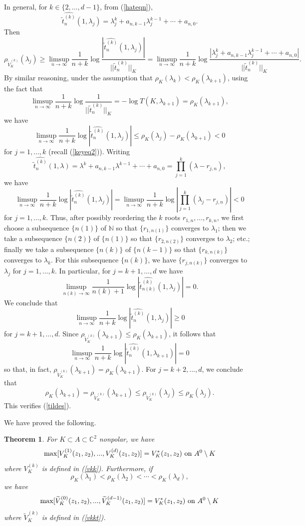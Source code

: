 \documentclass[12pt]{article}
\numberwithin{equation}{section}
\newtheorem{theorem}{Theorem}[section]
\newcommand{\C}{\mathbb{C}}
\newcommand{\N}{\mathbb{N}}
\renewcommand{\hat}{\widehat}
\renewcommand{\tilde}{\widetilde}
\begin{document}
In general, for $k\in \{2,...,d-1\}$, from (\ref{hateqn}), 
$$\hat {\tilde t_{n}^{(k)}}(1,\lambda_j) =\lambda_j^k +a_{n,k-1}\lambda_j^{k-1} +\cdots +a_{n,0}.$$
Then
$$\rho_{\tilde V_{K}^{(k)}}(\lambda_j)\geq \limsup_{n\to \infty} \frac{1}{n+k}\log \frac{ |\hat {\tilde t_{n}^{(k)}}(1,\lambda_j)|}{||\tilde t_{n}^{(k)}||_K}=\limsup_{n\to \infty} \frac{1}{n+k}\log \frac{| \lambda_j^k +a_{n,k-1}\lambda_j^{k-1} +\cdots +a_{n,0}|}{||\tilde t_{n}^{(k)}||_K}.$$
By similar reasoning, under the assumption that $\rho_K(\lambda_{k}) < \rho_K(\lambda_{k+1})$,
using the fact that
$$\limsup_{n\to \infty} \frac{1}{n+k}\log \frac{1}{||\tilde t_{n}^{(k)}||_K}= -\log T(K,\lambda_{k+1})= \rho_K(\lambda_{k+1}),$$
we have 
$$\limsup_{n\to \infty}  \frac{1}{n+k} \log |\hat {\tilde t_{n}^{(k)}}(1,\lambda_j)|\leq \rho_K(\lambda_j)-\rho_K(\lambda_{k+1}) <0$$
for $j=1,...,k$ (recall (\ref{keyeq2})). Writing
$$\hat {\tilde t_{n}^{(k)}}(1,\lambda)=\lambda^k +a_{n,k-1}\lambda^{k-1} +\cdots +a_{n,0}=\prod_{j=1}^k(\lambda - r_{j,n}),$$
we have
$$\limsup_{n\to \infty}  \frac{1}{n+k} \log |\hat {\tilde t_{n}^{(k)}}(1,\lambda_j)|=\limsup_{n\to \infty}  \frac{1}{n+k} \log |\prod_{j=1}^k(\lambda_j - r_{j,n})|<0$$
for $j=1,...,k$. Thus, after possibly reordering the $k$ roots $r_{1,n},...,r_{k,n}$, we first choose a subsequence $\{n(1)\}$ of $\N$ so that $\{r_{1,n(1)}\}$ converges to $\lambda_1$; then we take a subsequence $\{n(2)\}$ of $\{n(1)\}$ so that $\{r_{2,n(2)}\}$ converges to $\lambda_2$; etc.; finally we take a subsequence $\{n(k)\}$ of $\{n(k-1)\}$ so that $\{r_{k,n(k)}\}$ converges to $\lambda_k$. For this subsequence $\{n(k)\}$, we have $\{r_{j,n(k)}\}$ converges to $\lambda_j$ for $j=1,...,k$. In particular, for $j=k+1,...,d$ we have 
$$\limsup_{n(k)\to \infty}  \frac{1}{n(k)+1} \log |\hat {\tilde t_{n(k)}^{(k)}}(1,\lambda_j)|=0.$$
We conclude that
$$\limsup_{n\to \infty}  \frac{1}{n+k} \log |\hat {\tilde t_{n}^{(k)}}(1,\lambda_j)|\geq 0$$
for $j=k+1,...,d$. Since $\rho_{\tilde V_{K}^{(k)}}(\lambda_{k+1}) \leq  \rho_K(\lambda_{k+1})$, it follows that 
$$\limsup_{n\to \infty}  \frac{1}{n+k} \log |\hat {\tilde t_{n}^{(k)}}(1,\lambda_{k+1})|= 0$$
so that, in fact, $\rho_{\tilde V_{K}^{(k)}}(\lambda_{k+1}) =  \rho_K(\lambda_{k+1})$. For $j=k+2,...,d$, we conclude that
$$\rho_K(\lambda_{k+1})=\rho_{\tilde V_{K}^{(k)}}(\lambda_{k+1})\leq \rho_{\tilde V_{K}^{(k)}}(\lambda_{j}) \leq \rho_K(\lambda_{j}).$$
This verifies (\ref{tildes}).


We have proved the following.

\begin{theorem} \label{vkkvkkt} For $K\subset A\subset \C^2$ nonpolar, we have
$$\max [V_{K}^{(1)}(z_1,z_2),...,V_{K}^{(d)}(z_1,z_2)]= V_K^*(z_1,z_2)  \ \hbox{on} \ A^0 \setminus K$$
where $V_K^{(k)}$ is defined in (\ref{vkk}). Furthermore, if  
$$\rho_K(\lambda_1) < \rho_K(\lambda_2) < \cdots < \rho_K(\lambda_d),$$
we have
$$\max [\tilde V_{K}^{(0)}(z_1,z_2),...,\tilde V_{K}^{(d-1)}(z_1,z_2)]= V_K^*(z_1,z_2)  \ \hbox{on} \ A^0 \setminus K$$
where $\tilde V_{K}^{(k)}$ is defined in (\ref{vkkt}).

\end{theorem}
\end{document}
